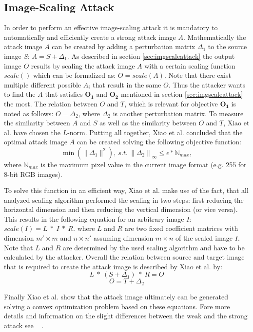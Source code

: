 \documentclass[sigconf]{acmart}
\begin{document}
\subsection{Image-Scaling Attack}
In order to perform an effective image-scaling attack it is mandatory to automatically and efficiently create a strong attack image $A$.
Mathematically the attack image $A$ can be created by adding a perturbation matrix ${\Delta}_1$ to the source image $S$: $A = S + {\Delta}_1$.
As described in section \ref{sec:imgscaleattack} the output image $O$ results by scaling the attack image $A$ with a certain scaling function $scale()$ which can be formalized as: $O = scale(A)$.
Note that there exist multiple different possible $A_i$ that result in the same $O$.
Thus the attacker wants to find the $A$ that satisfies $\boldsymbol{O_1}$ and $\boldsymbol{O_2}$ mentioned in section \ref{sec:imgscaleattack} the most.
The relation between $O$ and $T$, which is relevant for objective $\boldsymbol{O_1}$ is noted as follows: $O = {\Delta}_2$, where ${\Delta}_2$ is another perturbation matrix.
To measure the similarity between $A$ and $S$ as well as the similarity between $O$ and $T$, Xiao et al. have chosen the $L$-norm.
Putting all together, Xiao et al.\cite{camouflage} concluded that the optimal attack image $A$ can be created solving the following objective function: 
$$\min(\lVert{\Delta}_1\rVert ^2) {,~s.t.~} {\lVert{\Delta}_2\rVert}_\infty \leq \epsilon * {\mathbb{N}}_{max},$$
where ${\mathbb{N}}_{max}$ is the maximum pixel value in the current image format (e.g. 255 for 8-bit RGB images).

To solve this function in an efficient way, Xiao et al. make use of the fact, that all analyzed scaling algorithm performed the scaling in two steps: first reducing the horizontal dimension and then reducing the vertical dimension (or vice versa).
This results in the following equation for an arbitrary image $I$: $scale(I) = L~*~I~*~R$. where $L$ and $R$ are two fixed coefficient matrices with dimension $m' \times m$ and $n \times n'$ assuming dimension $m \times n$ of the scaled image $I$.
Note that $L$ and $R$ are determined by the used scaling algorithm and have to be calculated by the attacker.
Overall the relation between source and target image that is required to create the attack image is described by Xiao et al. by:
$$L~*~(S + {\Delta}_1)~*~R = O $$
$$ O = T +  {\Delta}_2$$

Finally Xiao et al. show that the attack image ultimately can be generated solving a convex optimization problem based on these equations.
Fore more details and information on the slight differences between the weak and the strong attack see ~ \cite{camouflage}.
\end{document}
